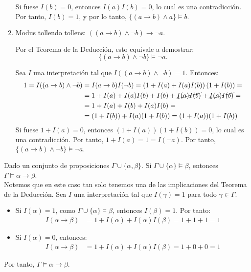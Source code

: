 \begin{ejercicio}
\begin{enumerate}
        Si fuese $I(b) = 0$, entonces $I(a)I(b) = 0$, lo cual es una contradicción. Por tanto, $I(b) = 1$, y por lo tanto, $\{(a \rightarrow b)\land a\} \models b$.
        \item Modus tollendo tollens: $((a \rightarrow b)\land \neg b) \rightarrow \neg a$.
        
        Por el Teorema de la Deducción, esto equivale a demostrar:
        \begin{equation*}
            \{(a \rightarrow b)\land \neg b\} \models \neg a.
        \end{equation*}

        Sea $I$ una interpretación tal que $I((a \rightarrow b)\land \neg b) = 1$. Entonces:
        \begin{align*}
            1=I((a \rightarrow b)\land \neg b) &= I(a \rightarrow b)I(\neg b) = \left(1+I(a)+I(a)I(b)\right)(1+I(b)) =\\&= 1+I(a)+I(a)I(b)+I(b)+\cancel{I(a)I(b)}+\cancel{I(a)I(b)} =\\&= 1+I(a)+I(b)+I(a)I(b)
            =\\&= (1+I(b)) + I(a)(1+I(b))
            = (1+I(a))(1+I(b))
        \end{align*}
        Si fuese $1+I(a) = 0$, entonces $(1+I(a))(1+I(b)) = 0$, lo cual es una contradicción. Por tanto, $1+I(a) = 1 = I(\neg a)$. Por tanto, $\{(a \rightarrow b)\land \neg b\} \models \neg a$.
    \end{enumerate}
\end{ejercicio}

\begin{ejercicio}\label{ej:1.3}
    Dado un conjunto de proposiciones $\Gamma \cup \{\alpha, \beta\}$. Si $\Gamma \cup \{\alpha\} \models \beta$, entonces $\Gamma \models \alpha \rightarrow \beta$.\\

    Notemos que en este caso tan solo tenemos una de las implicaciones del Teorema de la Deducción. Sea $I$ una interpretación tal que $I(\gamma)=1$ para todo $\gamma\in\Gamma$.
    \begin{itemize}
        \item Si $I(\alpha)=1$, como $\Gamma \cup \{\alpha\} \models \beta$, entonces $I(\beta)=1$. Por tanto:
        \begin{align*}
            I(\alpha\rightarrow\beta) &= 1+I(\alpha)+I(\alpha)I(\beta) = 1+1+1 = 1
        \end{align*}

        \item Si $I(\alpha)=0$, entonces:
        \begin{align*}
            I(\alpha\rightarrow\beta) &= 1+I(\alpha)+I(\alpha)I(\beta) = 1+0+0 = 1
        \end{align*}
    \end{itemize}

    Por tanto, $\Gamma \models \alpha \rightarrow \beta$.
\end{ejercicio}

